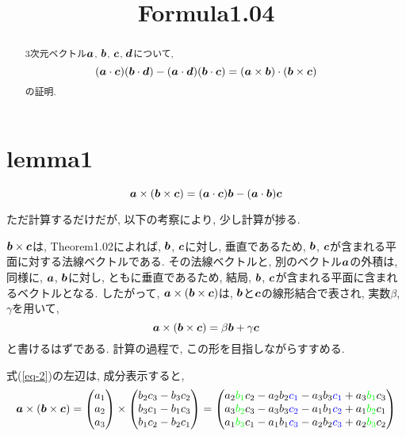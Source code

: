\documentclass{jsarticle}
\title{Formula1.04}
\newcommand*{\mbold}[1]{\mbox{\boldmath $#1$}}
\begin{document}
\maketitle
\begin{abstract}
  3次元ベクトル$\mbold{a}$, $\mbold{b}$, $\mbold{c}$, $\mbold{d}$について, 
  \begin{equation}\label{eq-1}
    (\mbold{a} \cdot \mbold{c})(\mbold{b} \cdot \mbold{d}) 
    -(\mbold{a} \cdot \mbold{d})(\mbold{b} \cdot \mbold{c}) 
    = (\mbold{a} \times \mbold{b}) \cdot (\mbold{b} \times \mbold{c}) 
  \end{equation}
  の証明. 
\end{abstract}

\section{lemma1}\label{lemma-1}
\begin{equation}\label{eq-2}
  \mbold{a} \times (\mbold{b} \times \mbold{c})
  = (\mbold{a} \cdot \mbold{c})\mbold{b} - (\mbold{a} \cdot \mbold{b})\mbold{c}
\end{equation}

ただ計算するだけだが, 以下の考察により, 少し計算が捗る. 

$\mbold{b} \times \mbold{c}$は, Theorem1.02によれば, $\mbold{b}$, $\mbold{c}$に対し, 垂直であるため, $\mbold{b}$, $\mbold{c}$が含まれる平面に対する法線ベクトルである. 
その法線ベクトルと, 別のベクトル$\mbold{a}$の外積は, 同様に, $\mbold{a}$, $\mbold{b}$に対し, ともに垂直であるため, 結局, $\mbold{b}$, $\mbold{c}$が含まれる平面に含まれるベクトルとなる. 
したがって, $\mbold{a} \times (\mbold{b} \times \mbold{c})$は, $\mbold{b}$と$\mbold{c}$の線形結合で表され, 
実数$\beta$, $\gamma$を用いて, 
\[
  \mbold{a} \times (\mbold{b} \times \mbold{c}) = \beta \mbold{b} + \gamma \mbold{c}
\]
と書けるはずである. 計算の過程で, この形を目指しながらすすめる. 

式(\ref{eq-2})の左辺は, 成分表示すると, 
\begin{equation}\label{eq-3}
  \mbold{a} \times (\mbold{b} \times \mbold{c})
  = \begin{pmatrix}
      a_1 \\
      a_2 \\
      a_3
    \end{pmatrix}
    \times
    \begin{pmatrix}
      b_2 c_3 - b_3 c_2 \\
      b_3 c_1 - b_1 c_3 \\
      b_1 c_2 - b_2 c_1
    \end{pmatrix}
  = \begin{pmatrix}
      a_2 \textcolor{green}{b_1} c_2 - a_2 b_2 \textcolor{blue}{c_1} - a_3 b_3 \textcolor{blue}{c_1} + a_3 \textcolor{green}{b_1} c_3 \\
      a_3 \textcolor{green}{b_2} c_3 - a_3 b_3 \textcolor{blue}{c_2} - a_1 b_1 \textcolor{blue}{c_2} + a_1 \textcolor{green}{b_2} c_1 \\
      a_1 \textcolor{green}{b_3} c_1 - a_1 b_1 \textcolor{blue}{c_3} - a_2 b_2 \textcolor{blue}{c_3} + a_2 \textcolor{green}{b_3} c_2
    \end{pmatrix}
\end{equation}
\end{document}
